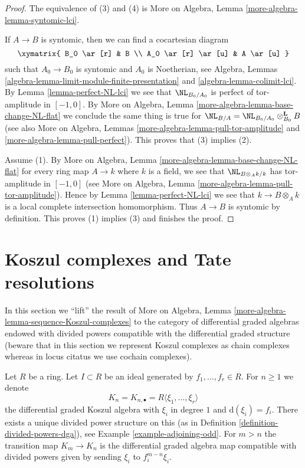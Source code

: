 \begin{proof}
The equivalence of (3) and (4) is More on Algebra, Lemma
\ref{more-algebra-lemma-syntomic-lci}.

\medskip\noindent
If $A \to B$ is syntomic, then we can find a cocartesian diagram
$$
\xymatrix{
B_0 \ar[r] & B \\
A_0 \ar[r] \ar[u] & A \ar[u]
}
$$
such that $A_0 \to B_0$ is syntomic and $A_0$ is Noetherian, see
Algebra, Lemmas \ref{algebra-lemma-limit-module-finite-presentation} and
\ref{algebra-lemma-colimit-lci}. By Lemma \ref{lemma-perfect-NL-lci}
we see that $\NL_{B_0/A_0}$ is perfect of tor-amplitude in $[-1, 0]$.
By More on Algebra, Lemma \ref{more-algebra-lemma-base-change-NL-flat}
we conclude the same thing is true for
$\NL_{B/A} = \NL_{B_0/A_0} \otimes_{B_0}^\mathbf{L} B$ (see
also More on Algebra, Lemmas \ref{more-algebra-lemma-pull-tor-amplitude} and
\ref{more-algebra-lemma-pull-perfect}).
This proves that (3) implies (2).

\medskip\noindent
Assume (1). By More on Algebra, Lemma
\ref{more-algebra-lemma-base-change-NL-flat}
for every ring map $A \to k$ where
$k$ is a field, we see that $\NL_{B \otimes_A k/k}$ has
tor-amplitude in $[-1, 0]$ (see
More on Algebra, Lemma \ref{more-algebra-lemma-pull-tor-amplitude}).
Hence by Lemma \ref{lemma-perfect-NL-lci} we see that $k \to B \otimes_A k$ is
a local complete intersection homomorphism. Thus $A \to B$
is syntomic by definition. This proves (1) implies (3)
and finishes the proof.
\end{proof}





\section{Koszul complexes and Tate resolutions}
\label{section-koszul-vs-tate}

\noindent
In this section we ``lift'' the result of
More on Algebra, Lemma \ref{more-algebra-lemma-sequence-Koszul-complexes}
to the category of differential graded algebras endowed with divided
powers compatible with the differential graded structure (beware
that in this section we represent Koszul complexes as chain complexes
whereas in locus citatus we use cochain complexes).

\medskip\noindent
Let $R$ be a ring. Let $I \subset R$ be an ideal generated
by $f_1, \ldots, f_r \in R$. For $n \geq 1$ we denote
$$
K_n = K_{n, \bullet} = R\langle \xi_1, \ldots, \xi_r\rangle
$$
the differential graded Koszul algebra with $\xi_i$ in degree $1$ and
$\text{d}(\xi_i) = f_i$. There exists a unique divided power structure on this
(as in Definition \ref{definition-divided-powers-dga}), see
Example \ref{example-adjoining-odd}. For $m > n$ the transition map
$K_m \to K_n$ is the differential graded algebra map compatible with
divided powers given by sending $\xi_i$ to $f_i^{m - n}\xi_i$.

